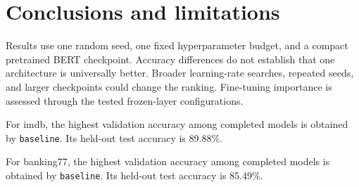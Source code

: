 \clearpage

\section{Conclusions and limitations}

Results use one random seed, one fixed hyperparameter budget, and a compact pretrained BERT checkpoint. Accuracy differences do not establish that one architecture is universally better. Broader learning-rate searches, repeated seeds, and larger checkpoints could change the ranking. Fine-tuning importance is assessed through the tested frozen-layer configurations.

For imdb, the highest validation accuracy among completed models is obtained by \texttt{baseline}. Its held-out test accuracy is 89.88\%.

For banking77, the highest validation accuracy among completed models is obtained by \texttt{baseline}. Its held-out test accuracy is 85.49\%.